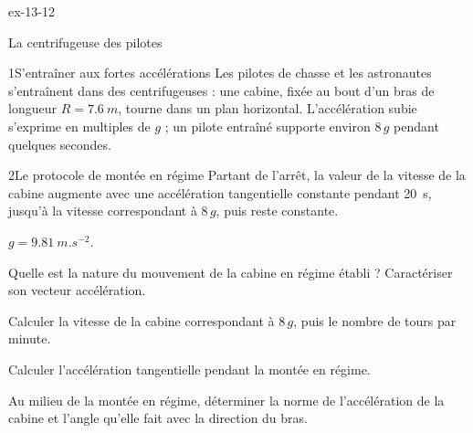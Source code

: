 \begin{blocLivre}{ex-13-12}
\begin{exercice}[3]{La centrifugeuse des pilotes}
\begin{docu}{1}{S'entraîner aux fortes accélérations}
Les pilotes de chasse et les astronautes s'entraînent dans des centrifugeuses : une cabine, fixée au bout d'un bras de
longueur $R=\qty{7,6}{m}$, tourne dans un plan horizontal. L'accélération subie s'exprime en multiples de $g$ ; un
pilote entraîné supporte environ $8\,g$ pendant quelques secondes.
\end{docu}
\begin{docu}{2}{Le protocole de montée en régime}
Partant de l'arrêt, la valeur de la vitesse de la cabine augmente avec une accélération tangentielle constante pendant
20~s, jusqu'à la vitesse correspondant à $8\,g$, puis reste constante.
\end{docu}
\begin{donnees}
$g=\qty{9,81}{m.s^{-2}}$.
\end{donnees}
\begin{questions}
\item Quelle est la nature du mouvement de la cabine en régime établi ? Caractériser son vecteur accélération.
\item Calculer la vitesse de la cabine correspondant à $8\,g$, puis le nombre de tours par minute.
\item Calculer l'accélération tangentielle pendant la montée en régime.
\item \initiative Au milieu de la montée en régime, déterminer la norme de l'accélération de la cabine et l'angle qu'elle
fait avec la direction du bras.
\end{questions}
\end{exercice}
\end{blocLivre}
